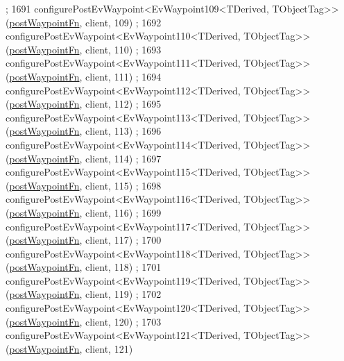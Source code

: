 \begin{DoxyCode}
      ;
1691     configurePostEvWaypoint<EvWaypoint109<TDerived, TObjectTag>>(\hyperlink{classmove__base__z__client_1_1WaypointEventDispatcher_acc538eb7506c13f7cca2268a1742dadd}{postWaypointFn}, client, 109)
      ;
1692     configurePostEvWaypoint<EvWaypoint110<TDerived, TObjectTag>>(\hyperlink{classmove__base__z__client_1_1WaypointEventDispatcher_acc538eb7506c13f7cca2268a1742dadd}{postWaypointFn}, client, 110)
      ;
1693     configurePostEvWaypoint<EvWaypoint111<TDerived, TObjectTag>>(\hyperlink{classmove__base__z__client_1_1WaypointEventDispatcher_acc538eb7506c13f7cca2268a1742dadd}{postWaypointFn}, client, 111)
      ;
1694     configurePostEvWaypoint<EvWaypoint112<TDerived, TObjectTag>>(\hyperlink{classmove__base__z__client_1_1WaypointEventDispatcher_acc538eb7506c13f7cca2268a1742dadd}{postWaypointFn}, client, 112)
      ;
1695     configurePostEvWaypoint<EvWaypoint113<TDerived, TObjectTag>>(\hyperlink{classmove__base__z__client_1_1WaypointEventDispatcher_acc538eb7506c13f7cca2268a1742dadd}{postWaypointFn}, client, 113)
      ;
1696     configurePostEvWaypoint<EvWaypoint114<TDerived, TObjectTag>>(\hyperlink{classmove__base__z__client_1_1WaypointEventDispatcher_acc538eb7506c13f7cca2268a1742dadd}{postWaypointFn}, client, 114)
      ;
1697     configurePostEvWaypoint<EvWaypoint115<TDerived, TObjectTag>>(\hyperlink{classmove__base__z__client_1_1WaypointEventDispatcher_acc538eb7506c13f7cca2268a1742dadd}{postWaypointFn}, client, 115)
      ;
1698     configurePostEvWaypoint<EvWaypoint116<TDerived, TObjectTag>>(\hyperlink{classmove__base__z__client_1_1WaypointEventDispatcher_acc538eb7506c13f7cca2268a1742dadd}{postWaypointFn}, client, 116)
      ;
1699     configurePostEvWaypoint<EvWaypoint117<TDerived, TObjectTag>>(\hyperlink{classmove__base__z__client_1_1WaypointEventDispatcher_acc538eb7506c13f7cca2268a1742dadd}{postWaypointFn}, client, 117)
      ;
1700     configurePostEvWaypoint<EvWaypoint118<TDerived, TObjectTag>>(\hyperlink{classmove__base__z__client_1_1WaypointEventDispatcher_acc538eb7506c13f7cca2268a1742dadd}{postWaypointFn}, client, 118)
      ;
1701     configurePostEvWaypoint<EvWaypoint119<TDerived, TObjectTag>>(\hyperlink{classmove__base__z__client_1_1WaypointEventDispatcher_acc538eb7506c13f7cca2268a1742dadd}{postWaypointFn}, client, 119)
      ;
1702     configurePostEvWaypoint<EvWaypoint120<TDerived, TObjectTag>>(\hyperlink{classmove__base__z__client_1_1WaypointEventDispatcher_acc538eb7506c13f7cca2268a1742dadd}{postWaypointFn}, client, 120)
      ;
1703     configurePostEvWaypoint<EvWaypoint121<TDerived, TObjectTag>>(\hyperlink{classmove__base__z__client_1_1WaypointEventDispatcher_acc538eb7506c13f7cca2268a1742dadd}{postWaypointFn}, client, 121)

\end{DoxyCode}
